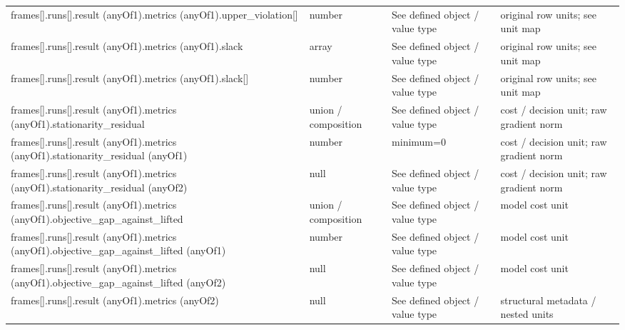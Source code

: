 \begin{longtable}{@{}>{\raggedright\arraybackslash}p{}>{\raggedright\arraybackslash}p{}>{\raggedright\arraybackslash}p{}>{\raggedright\arraybackslash}p{}@{}}
frames[].\allowbreak{}runs[].\allowbreak{}result (anyOf1).\allowbreak{}metrics (anyOf1).\allowbreak{}upper\_\allowbreak{}violation[] & number & See defined object /\allowbreak{} value type & original row units; see unit map\\
frames[].\allowbreak{}runs[].\allowbreak{}result (anyOf1).\allowbreak{}metrics (anyOf1).\allowbreak{}slack & array & See defined object /\allowbreak{} value type & original row units; see unit map\\
frames[].\allowbreak{}runs[].\allowbreak{}result (anyOf1).\allowbreak{}metrics (anyOf1).\allowbreak{}slack[] & number & See defined object /\allowbreak{} value type & original row units; see unit map\\
frames[].\allowbreak{}runs[].\allowbreak{}result (anyOf1).\allowbreak{}metrics (anyOf1).\allowbreak{}stationarity\_\allowbreak{}residual & union /\allowbreak{} composition & See defined object /\allowbreak{} value type & cost /\allowbreak{} decision unit; raw gradient norm\\
frames[].\allowbreak{}runs[].\allowbreak{}result (anyOf1).\allowbreak{}metrics (anyOf1).\allowbreak{}stationarity\_\allowbreak{}residual (anyOf1) & number & minimum=\allowbreak{}0 & cost /\allowbreak{} decision unit; raw gradient norm\\
frames[].\allowbreak{}runs[].\allowbreak{}result (anyOf1).\allowbreak{}metrics (anyOf1).\allowbreak{}stationarity\_\allowbreak{}residual (anyOf2) & null & See defined object /\allowbreak{} value type & cost /\allowbreak{} decision unit; raw gradient norm\\
frames[].\allowbreak{}runs[].\allowbreak{}result (anyOf1).\allowbreak{}metrics (anyOf1).\allowbreak{}objective\_\allowbreak{}gap\_\allowbreak{}against\_\allowbreak{}lifted & union /\allowbreak{} composition & See defined object /\allowbreak{} value type & model cost unit\\
frames[].\allowbreak{}runs[].\allowbreak{}result (anyOf1).\allowbreak{}metrics (anyOf1).\allowbreak{}objective\_\allowbreak{}gap\_\allowbreak{}against\_\allowbreak{}lifted (anyOf1) & number & See defined object /\allowbreak{} value type & model cost unit\\
frames[].\allowbreak{}runs[].\allowbreak{}result (anyOf1).\allowbreak{}metrics (anyOf1).\allowbreak{}objective\_\allowbreak{}gap\_\allowbreak{}against\_\allowbreak{}lifted (anyOf2) & null & See defined object /\allowbreak{} value type & model cost unit\\
frames[].\allowbreak{}runs[].\allowbreak{}result (anyOf1).\allowbreak{}metrics (anyOf2) & null & See defined object /\allowbreak{} value type & structural metadata /\allowbreak{} nested units\\

\end{longtable}
